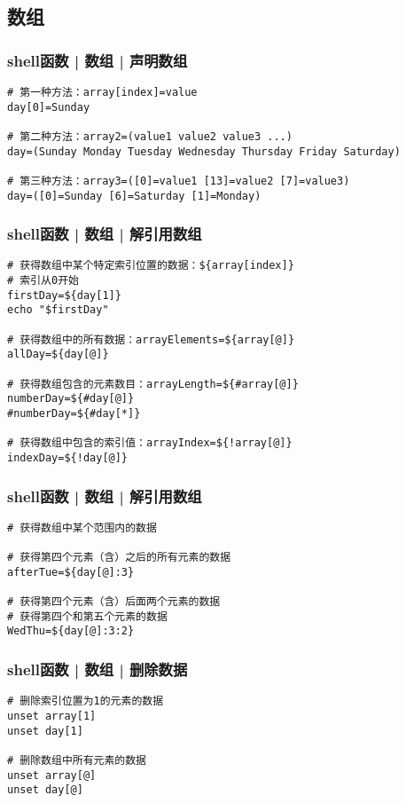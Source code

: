 \subsection{数组}
\begin{frame}[fragile]
  \frametitle{shell函数 | 数组 | \alert{声明数组}}
\begin{lstlisting}
# 第一种方法：array[index]=value
day[0]=Sunday

# 第二种方法：array2=(value1 value2 value3 ...)
day=(Sunday Monday Tuesday Wednesday Thursday Friday Saturday)

# 第三种方法：array3=([0]=value1 [13]=value2 [7]=value3)
day=([0]=Sunday [6]=Saturday [1]=Monday)
\end{lstlisting}
\end{frame}

\begin{frame}[fragile]
  \frametitle{shell函数 | 数组 | \alert{解引用数组}}
\begin{lstlisting}
# 获得数组中某个特定索引位置的数据：${array[index]}
# 索引从0开始
firstDay=${day[1]}
echo "$firstDay"

# 获得数组中的所有数据：arrayElements=${array[@]}
allDay=${day[@]}

# 获得数组包含的元素数目：arrayLength=${#array[@]}
numberDay=${#day[@]}
#numberDay=${#day[*]}

# 获得数组中包含的索引值：arrayIndex=${!array[@]}
indexDay=${!day[@]}
\end{lstlisting}
\end{frame}

\begin{frame}[fragile]
  \frametitle{shell函数 | 数组 | \alert{解引用数组}}
\begin{lstlisting}
# 获得数组中某个范围内的数据

# 获得第四个元素（含）之后的所有元素的数据
afterTue=${day[@]:3}

# 获得第四个元素（含）后面两个元素的数据
# 获得第四个和第五个元素的数据
WedThu=${day[@]:3:2}
\end{lstlisting}
\end{frame}

\begin{frame}[fragile]
  \frametitle{shell函数 | 数组 | \alert{删除数据}}
\begin{lstlisting}
# 删除索引位置为1的元素的数据
unset array[1]
unset day[1]

# 删除数组中所有元素的数据
unset array[@]
unset day[@]
\end{lstlisting}
\end{frame}

